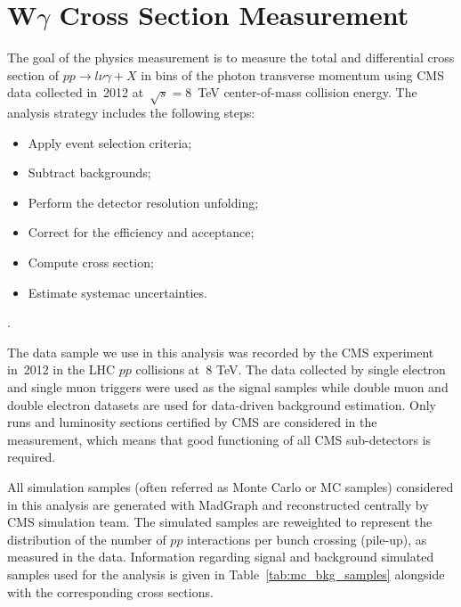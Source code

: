 \chapter{W$\gamma$ Cross Section Measurement}
\label{sec:AN_WgMeas}
The goal of the physics measurement is to measure the total and differential cross section of $pp \rightarrow l\nu\gamma + X$ in bins of the photon transverse momentum using CMS data collected in~2012 at~$\sqrt{s}=8$~TeV center-of-mass collision energy. The analysis strategy includes the following steps:
\begin{itemize}
  \item Apply event selection criteria;
  \item Subtract backgrounds;
  \item Perform the detector resolution unfolding;
  \item Correct for the efficiency and acceptance;
  \item Compute cross section;
  \item Estimate systemac uncertainties.
\end{itemize}
.

The data sample we use in this analysis was recorded by the CMS experiment in~2012 in the LHC $pp$ collisions at~8 TeV. The data collected by single electron and single muon triggers were used as the signal samples while double muon and double electron datasets are used for data-driven background estimation. Only runs and luminosity sections certified by CMS are considered in the measurement, which means that good functioning of all CMS sub-detectors is required.

All simulation samples (often referred as Monte Carlo or MC samples) considered in this analysis are generated with MadGraph and reconstructed centrally by CMS simulation team. The simulated samples are reweighted to represent the distribution of the number of $pp$ interactions per bunch crossing (pile-up), as measured in the data. Information regarding signal and background simulated samples used for the analysis is given in Table~\ref{tab:mc_bkg_samples} alongside with the corresponding cross sections. 

